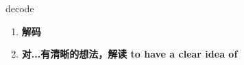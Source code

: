 
\begin{frame}
{\huge decode}
\begin{center}
\begin{enumerate}\Large
  \item \textbf{解码}
  \item \textbf{对...有清晰的想法，解读 to have a clear idea of}
\end{enumerate}
\end{center}
\end{frame}
